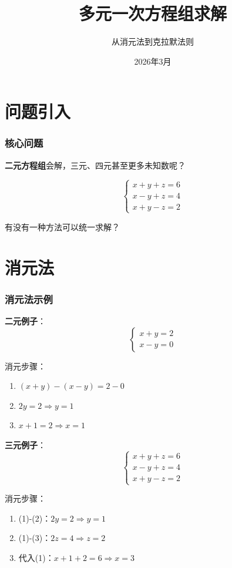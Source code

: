 \documentclass[aspectratio=169,12pt]{beamer}
\title{多元一次方程组求解}
\subtitle{从消元法到克拉默法则}
\author{}
\date{2026年3月}
\begin{document}
\frame{\titlepage}

\section{问题引入}

\begin{frame}
\frametitle{核心问题}
\textbf{二元方程组}会解，三元、四元甚至更多未知数呢？

\[
\begin{cases}
x + y + z = 6 \\
x - y + z = 4 \\
x + y - z = 2
\end{cases}
\]

\bigskip
\pause
\centerline{\Large 有没有一种方法可以统一求解？}
\end{frame}

\section{消元法}

\begin{frame}
\frametitle{消元法示例}
\textbf{二元例子}：
\[
\begin{cases} x + y = 2 \\ x - y = 0 \end{cases}
\]

消元步骤：
\begin{enumerate}
    \item $(x+y) - (x-y) = 2-0$
    \item $2y = 2 \Rightarrow y = 1$
    \item $x + 1 = 2 \Rightarrow x = 1$
\end{enumerate}
\end{frame}

\begin{frame}
\pause
\textbf{三元例子}：
\[
\begin{cases}
x + y + z = 6 \\
x - y + z = 4 \\
x + y - z = 2
\end{cases}
\]

消元步骤：
\begin{enumerate}
    \item (1)-(2)：$2y = 2 \Rightarrow y = 1$
    \item (1)-(3)：$2z = 4 \Rightarrow z = 2$
    \item 代入(1)：$x + 1 + 2 = 6 \Rightarrow x = 3$
\end{enumerate}
\end{frame}
\end{document}
